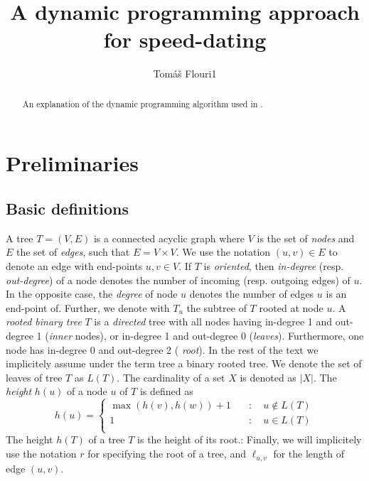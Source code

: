 \documentclass{llncs}
\begin{document}
\title{A dynamic programming approach for speed-dating}


\author{Tom\'{a}\v{s} Flouri1}

\maketitle

\begin{abstract}
An explanation of the dynamic programming algorithm used in \cite{Akerborg2008}.
\end{abstract}

\section{Preliminaries}

\subsection{Basic definitions}

A tree $T=(V,E)$ is a connected acyclic graph where $V$ is the set of {\em
nodes} and $E$ the set of {\em edges}, such that $E = V\times V$. We use the
notation $(u,v) \in E$ to denote an edge with end-points $u,v \in V$. If $T$ is
{\em oriented}, then {\em in-degree} (resp. {\em out-degree}) of a node denotes
the number of incoming (resp. outgoing edges) of $u$. In the opposite case, the
{\em degree} of node $u$ denotes the number of edges $u$ is an end-point of.
Further, we denote with $T_u$ the subtree of $T$ rooted at node $u$.  A {\em
rooted binary tree} $T$ is a {\em directed} tree with all nodes having
in-degree 1 and out-degree 1 ({\em inner} nodes), or in-degree 1 and out-degree
0 ({\em leaves}). Furthermore, one node has in-degree 0 and out-degree 2 ({\em
root}).  In the rest of the text we implicitely assume under the term tree a
binary rooted tree.  We denote the set of leaves of tree $T$ as $L(T)$.  The
cardinality of a set $X$ is denoted as $|X|$. The {\em height} $h(u)$ of a node
$u$ of $T$ is defined as 
%
\[ h(u) = \left\{ \begin{array}{ll}
\max(h(v), h(w)) + 1 & \quad : \quad u \notin L(T)\\
1                    & \quad : \quad u    \in L(T)\\
\end{array}\right. \] 
The height $h(T)$ of a tree $T$ is the height of its root.: Finally, we will
implicitely use the notation $r$ for specifying the root of a tree, and
$\ell_{u,v}$ for the length of edge $(u,v)$.
\end{document}
